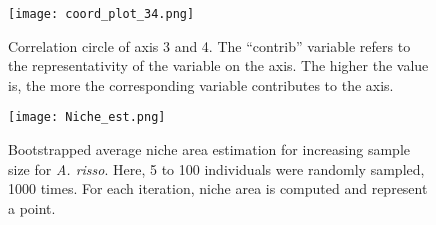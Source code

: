 \begin{figure} [!htbp]
	\begin{center}
		\texttt{[image: coord\_plot\_34.png]}
	\end{center}
	\caption[FAMD's correlation circle for third and fourth axis]{Correlation circle of axis 3 and 4. The ``contrib'' variable refers to the representativity of the variable on the axis. The higher the value is, the more the corresponding variable contributes to the axis.}
	\label{fig:corr_circ_34}
\end{figure}

\begin{figure} [!htbp]
	\begin{center}
		\texttt{[image: Niche\_est.png]}
	\end{center}
	\caption[Sample size on the estimate of the average niche area]{Bootstrapped average niche area estimation for increasing sample size for \textit{A. risso}. Here, 5 to 100 individuals were randomly sampled, 1000 times. For each iteration, niche area is computed and represent a point.}
	\label{fig:niche_est}
\end{figure}

